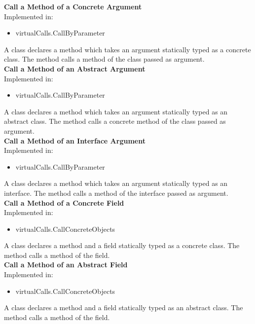 \documentclass{article}
\begin{document}
\noindent
\textbf{Call a Method of a Concrete Argument}\\
Implemented in: 
\begin{itemize}
    \item virtualCalls.CallByParameter
\end{itemize}
A class declares a method which takes an argument statically typed as a concrete class. The method calls a method of the class passed as argument.\\

\noindent
\textbf{Call a Method of an Abstract Argument}\\
Implemented in: 
\begin{itemize}
    \item virtualCalls.CallByParameter
\end{itemize}
A class declares a method which takes an argument statically typed as an abstract class. The method calls a concrete method of the class passed as argument.\\

\noindent
\textbf{Call a Method of an Interface Argument}\\
Implemented in: 
\begin{itemize}
    \item virtualCalls.CallByParameter
\end{itemize}
A class declares a method which takes an argument statically typed as an interface. The method calls a method of the interface passed as argument.\\

\noindent
\textbf{Call a Method of a Concrete Field}\\
Implemented in: 
\begin{itemize}
    \item virtualCalls.CallConcreteObjects
\end{itemize}
A class declares a method and a field statically typed as a concrete class. The method calls a method of the field.\\

\noindent
\textbf{Call a Method of an Abstract Field}\\
Implemented in: 
\begin{itemize}
    \item virtualCalls.CallConcreteObjects
\end{itemize}
A class declares a method and a field statically typed as an abstract class. The method calls a method of the field.\\
\end{document}
